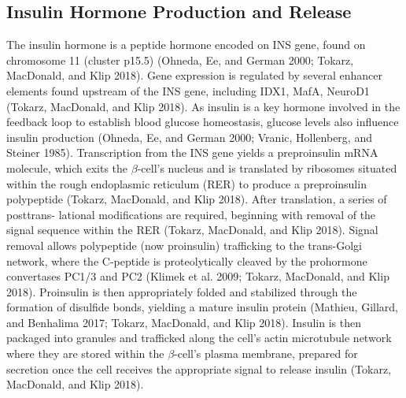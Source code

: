\documentclass{article}
\begin{document}
\subsection{Insulin Hormone Production and Release}
The insulin hormone is a peptide hormone encoded on INS gene, found on chromosome 11 (cluster p15.5) (Ohneda,
Ee, and German 2000; Tokarz, MacDonald, and Klip 2018). Gene expression is regulated by several enhancer elements found
upstream of the INS gene, including IDX1, MafA, NeuroD1 (Tokarz, MacDonald, and Klip 2018). As insulin is a key hormone
involved in the feedback loop to establish blood glucose homeostasis, glucose levels also influence insulin production (Ohneda,
Ee, and German 2000; Vranic, Hollenberg, and Steiner 1985). Transcription from the INS gene yields a preproinsulin mRNA
molecule, which exits the $\beta$-cell’s nucleus and is translated by ribosomes situated within the rough endoplasmic reticulum
(RER) to produce a preproinsulin polypeptide (Tokarz, MacDonald, and Klip 2018). After translation, a series of posttrans-
lational modifications are required, beginning with removal of the signal sequence within the RER (Tokarz, MacDonald, and
Klip 2018). Signal removal allows polypeptide (now proinsulin) trafficking to the trans-Golgi network, where the C-peptide
is proteolytically cleaved by the prohormone convertases PC1/3 and PC2 (Klimek et al. 2009; Tokarz, MacDonald, and Klip
2018). Proinsulin is then appropriately folded and stabilized through the formation of disulfide bonds, yielding a mature insulin
protein (Mathieu, Gillard, and Benhalima 2017; Tokarz, MacDonald, and Klip 2018). Insulin is then packaged into granules
and trafficked along the cell’s actin microtubule network where they are stored within the $\beta$-cell’s plasma membrane, prepared
for secretion once the cell receives the appropriate signal to release insulin (Tokarz, MacDonald, and Klip 2018).
\end{document}
